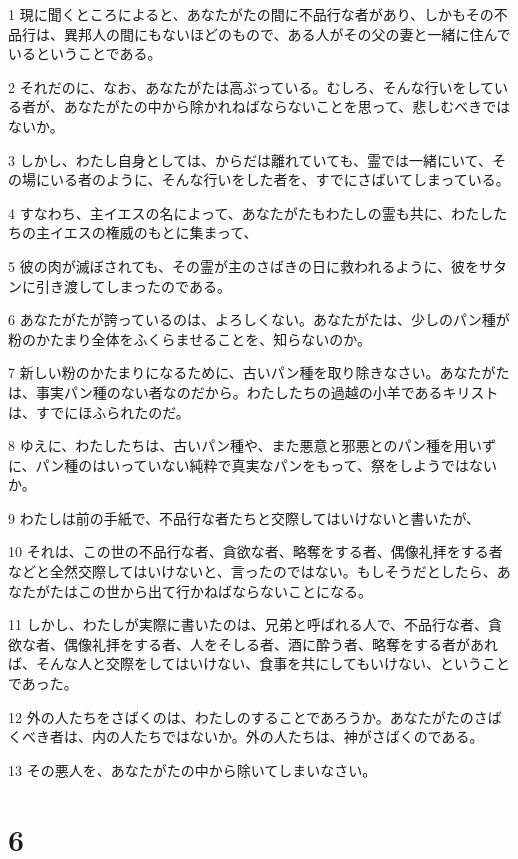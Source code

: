 \par 1 現に聞くところによると、あなたがたの間に不品行な者があり、しかもその不品行は、異邦人の間にもないほどのもので、ある人がその父の妻と一緒に住んでいるということである。
\par 2 それだのに、なお、あなたがたは高ぶっている。むしろ、そんな行いをしている者が、あなたがたの中から除かれねばならないことを思って、悲しむべきではないか。
\par 3 しかし、わたし自身としては、からだは離れていても、霊では一緒にいて、その場にいる者のように、そんな行いをした者を、すでにさばいてしまっている。
\par 4 すなわち、主イエスの名によって、あなたがたもわたしの霊も共に、わたしたちの主イエスの権威のもとに集まって、
\par 5 彼の肉が滅ぼされても、その霊が主のさばきの日に救われるように、彼をサタンに引き渡してしまったのである。
\par 6 あなたがたが誇っているのは、よろしくない。あなたがたは、少しのパン種が粉のかたまり全体をふくらませることを、知らないのか。
\par 7 新しい粉のかたまりになるために、古いパン種を取り除きなさい。あなたがたは、事実パン種のない者なのだから。わたしたちの過越の小羊であるキリストは、すでにほふられたのだ。
\par 8 ゆえに、わたしたちは、古いパン種や、また悪意と邪悪とのパン種を用いずに、パン種のはいっていない純粋で真実なパンをもって、祭をしようではないか。
\par 9 わたしは前の手紙で、不品行な者たちと交際してはいけないと書いたが、
\par 10 それは、この世の不品行な者、貪欲な者、略奪をする者、偶像礼拝をする者などと全然交際してはいけないと、言ったのではない。もしそうだとしたら、あなたがたはこの世から出て行かねばならないことになる。
\par 11 しかし、わたしが実際に書いたのは、兄弟と呼ばれる人で、不品行な者、貪欲な者、偶像礼拝をする者、人をそしる者、酒に酔う者、略奪をする者があれば、そんな人と交際をしてはいけない、食事を共にしてもいけない、ということであった。
\par 12 外の人たちをさばくのは、わたしのすることであろうか。あなたがたのさばくべき者は、内の人たちではないか。外の人たちは、神がさばくのである。
\par 13 その悪人を、あなたがたの中から除いてしまいなさい。

\chapter{6}

